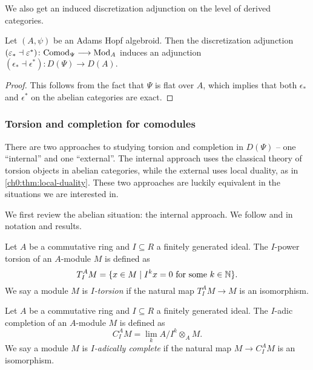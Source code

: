 We also get an induced discretization adjunction on the level of derived categories. 

\begin{proposition}
    Let $(A,\psi)$ be an Adams Hopf algebroid. Then the discretization adjunction $(\varepsilon_*\dashv \varepsilon^*)\colon \mathrm{Comod}_\Psi\longrightarrow \mathrm{Mod}_A$ induces an adjunction $(\epsilon_*\dashv \epsilon^*)\colon D(\Psi)\longrightarrow D(A).$
\end{proposition}
\begin{proof}
    This follows from the fact that $\Psi$ is flat over $A$, which implies that both $\epsilon_*$ and $\epsilon^*$ on the abelian categories are exact. 
\end{proof}






\subsubsection{Torsion and completion for comodules}
\label{ch0:sssec:torsion-and-completion-for-comodules}

There are two approaches to studying torsion and completion in $D(\Psi)$ -- one ``internal'' and one ``external''. The internal approach uses the classical theory of torsion objects in abelian categories, while the external uses local duality, as in \cref{ch0:thm:local-duality}. These two approaches are luckily equivalent in the situations we are interested in. 

We first review the abelian situation: the internal approach. We follow \cite{barthel-heard-valenzuela_2018} and \cite{barthel-heard-valenzuela_2020} in notation and results. 

\begin{definition}
    \label{def:I-power-torsion-module}
    Let $A$ be a commutative ring and $I\subseteq R$ a finitely generated ideal. The $I$-power torsion of an $A$-module $M$ is defined as
    \[T_I^A M = \{x\in M \mid I^k x = 0 \text{ for some } k\in \mathbb{N}\}.\]
    We say a module $M$ is \emph{$I$-torsion} if the natural map $T_I^A M\longrightarrow M$ is an isomorphism. 
\end{definition}

\begin{definition}
    Let $A$ be a commutative ring and $I\subseteq R$ a finitely generated ideal. The $I$-adic completion of an $A$-module $M$ is defined as
    \[C_I^A M = \lim_k A/I^k\otimes_A M.\]
    We say a module $M$ is \emph{$I$-adically complete} if the natural map $M\longrightarrow C_I^A M$ is an isomorphism. 
\end{definition}

